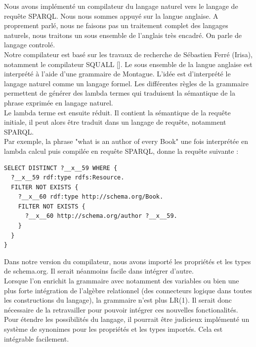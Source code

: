 \documentclass[a4paper, 12pt, twoside]{report}
\begin{document}
Nous avons implémenté un compilateur du langage naturel vers le langage de requête SPARQL. Nous nous sommes appuyé sur la langue anglaise. A proprement parlé, nous ne faisons pas un traitement complet des langages naturels, nous traitons un sous ensemble de l'anglais très encadré. On parle de langage controlé.\\

Notre compilateur est basé sur les travaux de recherche de Sébastien Ferré (Irisa), notamment le compilateur SQUALL []. Le sous ensemble de la langue anglaise est interprété à l'aide d'une grammaire de Montague. L'idée est d'interprété le langage naturel comme un langage formel. Les différentes règles de la grammaire permettent de générer des lambda termes qui traduisent la sémantique de la phrase exprimée en langage naturel.\\

Le lambda terme est ensuite réduit. Il contient la sémantique de la requête initiale, il peut alors être traduit dans un langage de requête, notamment SPARQL.\\

Par exemple, la phrase "what is an author of every Book" une fois interprétée en lambda calcul puis compilée en requête SPARQL, donne la requête suivante :\\

\begin{lstlisting}
SELECT DISTINCT ?__x__59 WHERE {
  ?__x__59 rdf:type rdfs:Resource.
  FILTER NOT EXISTS {
    ?__x__60 rdf:type http://schema.org/Book.
    FILTER NOT EXISTS {
      ?__x__60 http://schema.org/author ?__x__59.
    }
  }
}
\end{lstlisting}

Dans notre version du compilateur, nous avons importé les propriétés et les types de schema.org. Il serait néanmoins facile dans intégrer d'autre.\\

Lorsque l'on enrichit la grammaire avec notamment des variables ou bien une plus forte intégration de l'algèbre relationnel (des connecteurs logique dans toutes les constructions du langage), la grammaire n'est plus LR(1). Il serait donc nécessaire de la retravailler pour pouvoir intégrer ces nouvelles fonctionalités.\\

Pour étendre les possibilités du langage, il pourrait être judicieux implémenté un système de synonimes pour les propriétés et les types importés. Cela est intégrable facilement.
\end{document}
